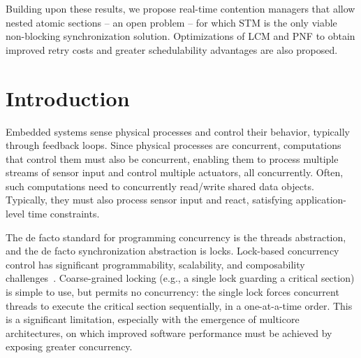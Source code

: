 \documentclass[12pt,english]{report}
\begin{document}
Building upon these results, we propose real-time contention managers that allow nested atomic sections -- an open problem -- for which STM is the only viable non-blocking synchronization solution. Optimizations of LCM and PNF to obtain improved retry costs and greater schedulability advantages are also proposed. 

\vfill



\pagebreak


\tableofcontents
\pagebreak

\listoffigures
\pagebreak

\listoftables
\pagebreak

\listofalgorithms
\pagebreak

\pagestyle{myheadings}

\chapter{\label{ch:introduction}Introduction}

Embedded systems sense physical processes and control their behavior, typically through feedback loops. Since physical processes are concurrent, computations that control them must also be concurrent, enabling them to process multiple streams of sensor input and control multiple actuators, all concurrently. Often, such computations need to concurrently read/write shared data objects. Typically, they must also process sensor input and react, satisfying application-level time constraints. 

The de facto standard for programming concurrency is the threads abstraction, and the de facto synchronization abstraction is locks. Lock-based concurrency control has significant programmability, scalability, and composability challenges~\cite{Herlihy:2006:AMP:1146381.1146382}. Coarse-grained locking (e.g., a single lock guarding a critical section) is simple to use, but permits no concurrency: the single lock forces concurrent threads to execute the critical section sequentially, in a one-at-a-time order. This is a significant limitation, especially with the emergence of multicore architectures, on which improved software performance must be achieved by exposing greater concurrency.  
\end{document}
